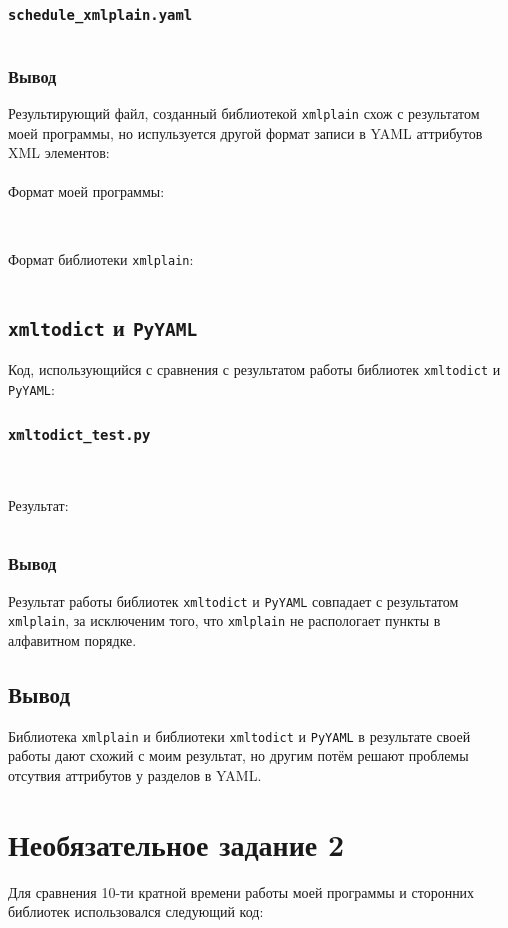 \documentclass[11pt]{article}
\begin{document}
\subsubsection{\texttt{schedule\_xmlplain.yaml}}
\inputminted{yaml}{../schedule_xmlplain.yaml}
\subsubsection{Вывод}
Результирующий файл, созданный библиотекой \texttt{xmlplain} схож с результатом моей программы, но испульзуется другой формат записи в YAML аттрибутов XML элементов:\\\\
Формат моей программы:
\inputminted{yaml}{../my_attrs_format.yaml}
~\\
Формат библиотеки \texttt{xmlplain}:
\inputminted{yaml}{../xmlplain_attrs_format.yaml}
\subsection{\texttt{xmltodict} и \texttt{PyYAML}}
Код, использующийся с сравнения с результатом работы библиотек \texttt{xmltodict} и \texttt{PyYAML}:
\subsubsection{ \texttt{xmltodict\_test.py}}
\inputminted{python}{../xmltodict_test.py}
~\\Результат:
\inputminted{yaml}{../schedule_xmltodict.yaml}
\subsubsection{Вывод}
Результат работы библиотек \texttt{xmltodict} и \texttt{PyYAML} совпадает с результатом \texttt{xmlplain}, за исключеним того, что \texttt{xmlplain} не распологает пункты в алфавитном порядке.
\subsection{Вывод}
Библиотека \texttt{xmlplain} и библиотеки \texttt{xmltodict} и \texttt{PyYAML} в результате своей работы дают схожий с моим результат,
но другим потём решают проблемы отсутвия аттрибутов у разделов в YAML.
\section{Необязательное задание 2}
Для сравнения 10-ти кратной времени работы моей программы и сторонних библиотек использовался следующий код:
\end{document}
